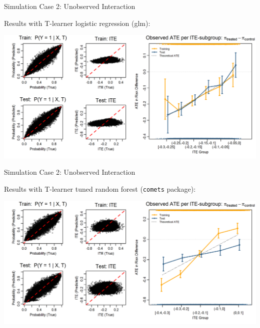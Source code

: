 \documentclass[onlytextwidth,english]{beamer}\usepackage[]{graphicx}\usepackage[]{xcolor}
\begin{document}
\begin{frame}{Simulation Case 2: Unobserved Interaction}

Results with T-learner logistic regression (glm):

\includegraphics[width=\textwidth]{img/unobserved_interaction_glm_tlearner.png}

\end{frame}

\begin{frame}{Simulation Case 2: Unobserved Interaction}

Results with T-learner tuned random forest (\texttt{comets} package):

\includegraphics[width=\textwidth]{img/unobserved_tuned_rf.png}

\end{frame}
\end{document}
